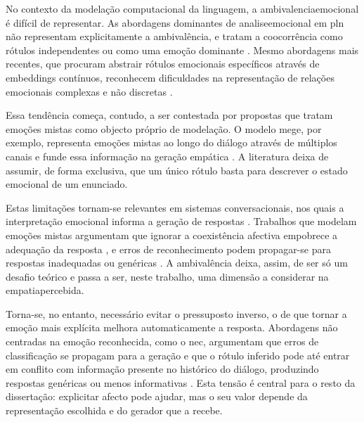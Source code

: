 No contexto da modelação computacional da linguagem, a \gls{ambivalenciaemocional} é difícil de representar. As abordagens dominantes de \gls{analiseemocional} em \gls{pln} não representam explicitamente a ambivalência, e tratam a coocorrência como rótulos independentes ou como uma emoção dominante \parencite{PlazaDelArco2024Trends, Seyeditabari2018Review, Zhao2026MEGE, Singh2026MultiEmotionIntensity}. Mesmo abordagens mais recentes, que procuram abstrair rótulos emocionais específicos através de embeddings contínuos, reconhecem dificuldades na representação de relações emocionais complexas e não discretas \parencite{BuechelEtAl2021Embeddings}.

Essa tendência começa, contudo, a ser contestada por propostas que tratam emoções mistas como objecto próprio de modelação. O modelo \gls{mege}, por exemplo, representa emoções mistas ao longo do diálogo através de múltiplos canais e funde essa informação na geração empática \parencite{Zhao2026MEGE}. A literatura deixa de assumir, de forma exclusiva, que um único rótulo basta para descrever o estado emocional de um enunciado.

Estas limitações tornam-se relevantes em sistemas conversacionais, nos quais a interpretação emocional informa a geração de respostas \parencite{Rashkin2019Empathy, Zhou2018ECM}. Trabalhos que modelam emoções mistas argumentam que ignorar a coexistência afectiva empobrece a adequação da resposta \parencite{Zhao2026MEGE, Wan2025EmoDynamiX, Singh2026MultiEmotionIntensity}, e erros de reconhecimento podem propagar-se para respostas inadequadas ou genéricas \parencite{Huangfu2025NEC}. A ambivalência deixa, assim, de ser só um desafio teórico e passa a ser, neste trabalho, uma dimensão a considerar na \gls{empatiapercebida}.

Torna-se, no entanto, necessário evitar o pressuposto inverso, o de que tornar a emoção mais explícita melhora automaticamente a resposta. Abordagens não centradas na emoção reconhecida, como o \gls{nec}, argumentam que erros de classificação se propagam para a geração e que o rótulo inferido pode até entrar em conflito com informação presente no histórico do diálogo, produzindo respostas genéricas ou menos informativas \parencite{Huangfu2025NEC}. Esta tensão é central para o resto da dissertação: explicitar afecto pode ajudar, mas o seu valor depende da representação escolhida e do gerador que a recebe.


